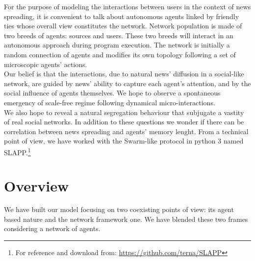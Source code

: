 For the purpose of modeling the interactions between users in the context of news spreading, it is convenient to talk about autonomous agents
linked by friendly ties whose overall view constitutes the network.
Network population is made of two breeds of agents: sources and users. These two breeds will interact
in an autonomous approach during program execution.
The network is initially a random connection of agents and modifies its own topology following a set of microscopic agents' actions.
\\Our belief is that the interactions, due to natural news' diffusion in a social-like network, are guided by news' ability to capture each agent's attention, and by the social influence of agents themselves.
We hope to observe a spontaneous emergency of scale-free regime following dynamical micro-interactions.\\ We also hope to reveal 
a natural segregation behaviour that subjugate a vastity of real social networks.
In addition to these questions we wonder if there can be correlation between news spreading and agents' memory lenght.
From a technical point of view, we have worked with the Swarm-like protocol in python 3 named SLAPP.\footnote{For reference and download from: \url{https://github.com/terna/SLAPP}}

\section{Overview}
We have built our model focusing on two coexisting points of view: its agent based nature and the network framework one. 
We have blended these two frames considering a network of agents. 
